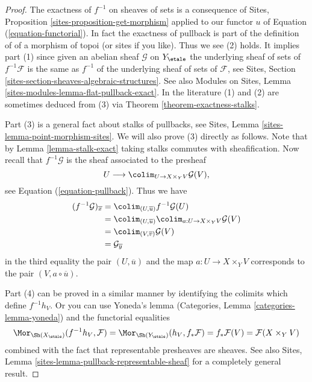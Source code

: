 \begin{proof}
The exactness of $f^{-1}$ on sheaves of sets is a consequence of
Sites, Proposition \ref{sites-proposition-get-morphism}
applied to our functor $u$ of Equation (\ref{equation-functorial}).
In fact the exactness of pullback is part of the definition of
of a morphism of topoi (or sites if you like). Thus we see (2) holds.
It implies part (1) since given an abelian sheaf $\mathcal{G}$ on
$Y_\etale$
the underlying sheaf of sets of $f^{-1}\mathcal{F}$ is the same
as $f^{-1}$ of the underlying sheaf of sets of $\mathcal{F}$, see
Sites, Section \ref{sites-section-sheaves-algebraic-structures}.
See also
Modules on Sites, Lemma \ref{sites-modules-lemma-flat-pullback-exact}.
In the literature (1) and (2) are sometimes deduced from (3) via
Theorem \ref{theorem-exactness-stalks}.

\medskip\noindent
Part (3) is a general fact about stalks of pullbacks, see
Sites, Lemma \ref{sites-lemma-point-morphism-sites}.
We will also prove (3) directly as follows. Note that by
Lemma \ref{lemma-stalk-exact}
taking stalks commutes with sheafification.
Now recall that $f^{-1}\mathcal{G}$ is the sheaf
associated to the presheaf
$$
U \longrightarrow \colim_{U \to X \times_Y V} \mathcal{G}(V),
$$
see Equation (\ref{equation-pullback}).
Thus we have
\begin{align*}
(f^{-1}\mathcal{G})_{\overline{x}}
& = \colim_{(U, \overline{u})} f^{-1}\mathcal{G}(U) \\
& = \colim_{(U, \overline{u})}
\colim_{a : U \to X \times_Y V} \mathcal{G}(V) \\
& = \colim_{(V, \overline{v})} \mathcal{G}(V) \\
& = \mathcal{G}_{\overline{y}}
\end{align*}
in the third equality the pair $(U, \overline{u})$ and the map
$a : U \to X \times_Y V$ corresponds to the pair $(V, a \circ \overline{u})$.

\medskip\noindent
Part (4) can be proved in a similar manner by identifying the colimits
which define $f^{-1}h_V$. Or you can use
Yoneda's lemma (Categories, Lemma \ref{categories-lemma-yoneda})
and the functorial equalities
$$
\Mor_{\Sh(X_\etale)}(f^{-1}h_V, \mathcal{F}) =
\Mor_{\Sh(Y_\etale)}(h_V, f_*\mathcal{F}) =
f_*\mathcal{F}(V) = \mathcal{F}(X \times_Y V)
$$
combined with the fact that representable presheaves are sheaves. See also
Sites, Lemma \ref{sites-lemma-pullback-representable-sheaf}
for a completely general result.
\end{proof}

